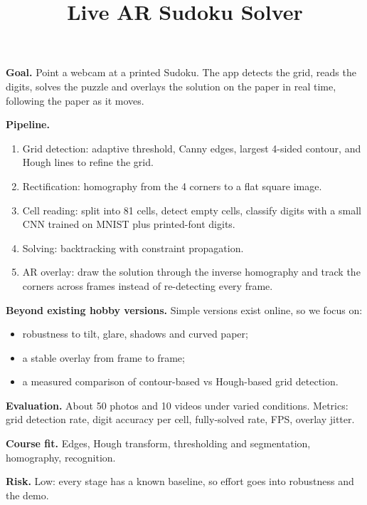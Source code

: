 \documentclass[11pt]{article}
\title{Live AR Sudoku Solver}
\author{}
\date{}
\begin{document}
\maketitle

\textbf{Goal.} Point a webcam at a printed Sudoku. The app detects the grid, reads the digits,
solves the puzzle and overlays the solution on the paper in real time, following the paper
as it moves.

\textbf{Pipeline.}
\begin{enumerate}
  \item Grid detection: adaptive threshold, Canny edges, largest 4-sided contour, and Hough
        lines to refine the grid.
  \item Rectification: homography from the 4 corners to a flat square image.
  \item Cell reading: split into 81 cells, detect empty cells, classify digits with a small
        CNN trained on MNIST plus printed-font digits.
  \item Solving: backtracking with constraint propagation.
  \item AR overlay: draw the solution through the inverse homography and track the corners
        across frames instead of re-detecting every frame.
\end{enumerate}

\textbf{Beyond existing hobby versions.} Simple versions exist online, so we focus on:
\begin{itemize}
  \item robustness to tilt, glare, shadows and curved paper;
  \item a stable overlay from frame to frame;
  \item a measured comparison of contour-based vs Hough-based grid detection.
\end{itemize}

\textbf{Evaluation.} About 50 photos and 10 videos under varied conditions. Metrics: grid
detection rate, digit accuracy per cell, fully-solved rate, FPS, overlay jitter.

\textbf{Course fit.} Edges, Hough transform, thresholding and segmentation, homography,
recognition.

\textbf{Risk.} Low: every stage has a known baseline, so effort goes into robustness and the
demo.
\end{document}
